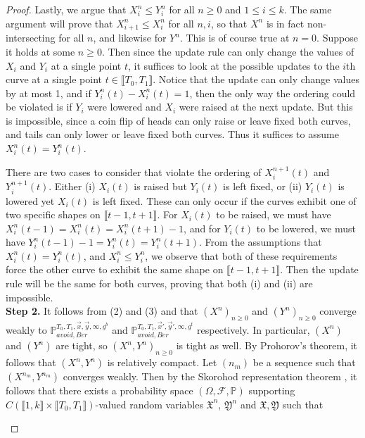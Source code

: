 \begin{proof}
	Lastly, we argue that $X^n_i\leq Y^n_i$ for all $n\geq 0$ and $1\leq i\leq k$. The same argument will prove that $X^n_{i+1}\leq X^n_i$ for all $n,i$, so that $X^n$ is in fact non-intersecting for all $n$, and likewise for $Y^n$. This is of course true at $n=0$. Suppose it holds at some $n\geq 0$. Then since the update rule can only change the values of $X_i$ and $Y_i$ at a single point $t$, it suffices to look at the possible updates to the $i$th curve at a single point $t\in\llbracket T_0, T_1\rrbracket$. Notice that the update can only change values by at most 1, and if $Y^n_i(t) - X^n_i(t) = 1$, then the only way the ordering could be violated is if $Y_i$ were lowered and $X_i$ were raised at the next update. But this is impossible, since a coin flip of heads can only raise or leave fixed both curves, and tails can only lower or leave fixed both curves. Thus it suffices to assume $X^n_i(t) = Y^n_i(t)$. 
	
	There are two cases to consider that violate the ordering of $X^{n+1}_i(t)$ and $Y^{n+1}_i(t)$. Either (i) $X_i(t)$ is raised but $Y_i(t)$ is left fixed, or (ii) $Y_i(t)$ is lowered yet $X_i(t)$ is left fixed. These can only occur if the curves exhibit one of two specific shapes on $\llbracket t-1, t+1\rrbracket$. For $X_i(t)$ to be raised, we must have $X^n_i(t-1) = X^n_i(t) = X^n_i(t+1) - 1$, and for $Y_i(t)$ to be lowered, we must have $Y^n_i(t-1) - 1 = Y^n_i(t) = Y^n_i(t+1)$. From the assumptions that $X^n_i(t) = Y^n_i(t)$, and $X^n_i \leq Y^n_i$, we observe that both of these requirements force the other curve to exhibit the same shape on $\llbracket t-1, t+1\rrbracket$. Then the update rule will be the same for both curves, proving that both (i) and (ii) are impossible. \\
	
	\noindent\textbf{Step 2.} It follows from (2) and (3) and \cite[Theorem 1.8.3]{Norris} that $(X^n)_{n\geq 0}$ and $(Y^n)_{n\geq 0}$ converge weakly to $\mathbb{P}_{avoid,Ber}^{T_0,T_1,\vec{x},\vec{y},\infty,g^b}$ and $\mathbb{P}_{avoid,Ber}^{T_0,T_1,\vec{x}',\vec{y}',\infty,g^t}$ respectively. In particular, $(X^n)$ and $(Y^n)$ are tight, so $(X^n,Y^n)_{n\geq 0}$ is tight as well. By Prohorov's theorem, it follows that $(X^n,Y^n)$ is relatively compact. Let $(n_m)$ be a sequence such that $(X^{n_m},Y^{n_m})$ converges weakly. Then by the Skorohod representation theorem \cite[Theorem 6.7]{Billing}, it follows that there exists a probability space $(\Omega,\mathcal{F},\mathbb{P})$ supporting $C(\llbracket 1, k\rrbracket \times \llbracket T_0, T_1\rrbracket)$-valued random variables $\mathfrak{X}^n$, $\mathfrak{Y}^n$ and $\mathfrak{X},\mathfrak{Y}$ such that
	\begin{enumerate}[label=(\arabic*)]
		

\end{enumerate}
\end{proof}
